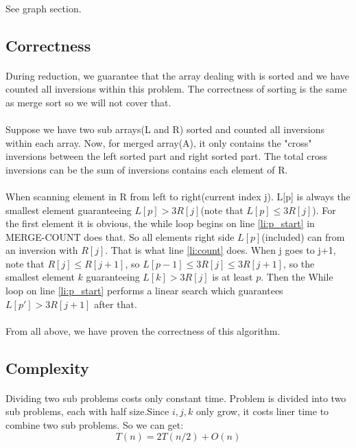 \documentclass[]{article}
\begin{document}
            \paragraph{}See graph section.
        \subsection{Correctness}
            \paragraph{} During reduction, we guarantee that the array dealing with is sorted and we have counted all inversions within this problem. The correctness of sorting is the same as merge sort so we will not cover that.
            \paragraph{} Suppose we have two sub arrays(L and R) sorted and counted all inversions within each array. Now, for merged array(A), it only contains the "cross" inversions between the left sorted part and right sorted part. The total cross inversions can be the sum of inversions contains each element of R.
            \paragraph{}When scanning element in R from left to right(current index j). L[p] is always the smallest element guaranteeing $L[p] > 3R[j]$(note that $L[p] \leq 3R[j]$). For the first element it is obvious, the while loop begins on line \ref{li:p_start} in MERGE-COUNT does that. So all elements right side $L[p]$(included) can from an inversion with $R[j]$. That is what line \ref{li:count} does. When j goes to j+1, note that $R[j] \leq R[j+1]$, so $L[p-1] \leq 3R[j] \leq 3R[j+1]$, so the smallest element $k$ guaranteeing $L[k] > 3R[j]$ is at least $p$. Then the While loop on line \ref{li:p_start} performs a linear search which guarantees $L[p'] > 3R[j+1]$ after that.
            \paragraph{}From all above, we have proven the correctness of this algorithm.
        \subsection{Complexity}
            \paragraph{} Dividing two sub problems costs only constant time. Problem is divided into two sub problems, each with half size.Since $i,j,k$ only grow, it costs liner time to combine two sub problems. So we can get:
            \begin{equation*}
                T(n) = 2T(n/2) + O(n)
            \end{equation*}
\end{document}
